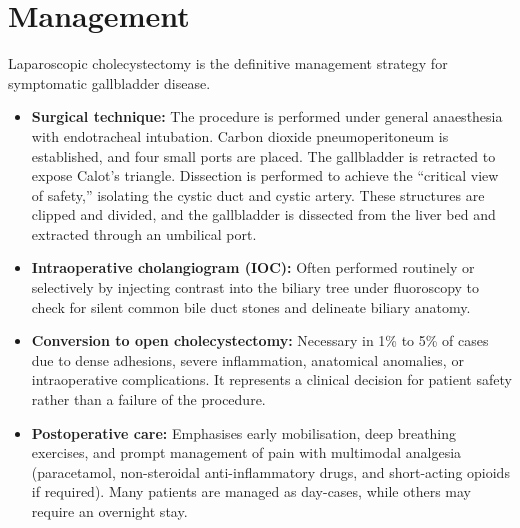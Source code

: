 \section*{Management}
Laparoscopic cholecystectomy is the definitive management strategy for symptomatic gallbladder disease.
\begin{itemize}
    \item \textbf{Surgical technique:} The procedure is performed under general anaesthesia with endotracheal intubation. Carbon dioxide pneumoperitoneum is established, and four small ports are placed. The gallbladder is retracted to expose Calot's triangle. Dissection is performed to achieve the ``critical view of safety,'' isolating the cystic duct and cystic artery. These structures are clipped and divided, and the gallbladder is dissected from the liver bed and extracted through an umbilical port.
    \item \textbf{Intraoperative cholangiogram (IOC):} Often performed routinely or selectively by injecting contrast into the biliary tree under fluoroscopy to check for silent common bile duct stones and delineate biliary anatomy.
    \item \textbf{Conversion to open cholecystectomy:} Necessary in 1\% to 5\% of cases due to dense adhesions, severe inflammation, anatomical anomalies, or intraoperative complications. It represents a clinical decision for patient safety rather than a failure of the procedure.
    \item \textbf{Postoperative care:} Emphasises early mobilisation, deep breathing exercises, and prompt management of pain with multimodal analgesia (paracetamol, non-steroidal anti-inflammatory drugs, and short-acting opioids if required). Many patients are managed as day-cases, while others may require an overnight stay.
\end{itemize}

